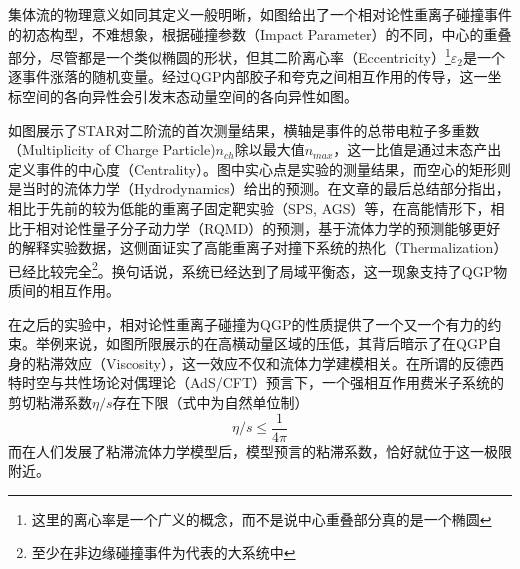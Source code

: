 \documentclass[%
 reprint,
 amsmath,amssymb,
 aps,
]{revtex4-1}
\begin{document}
集体流的物理意义如同其定义一般明晰，如图给出了一个相对论性重离子碰撞事件的初态构型，不难想象，根据碰撞参数（Impact Parameter）的不同，中心的重叠部分，尽管都是一个类似椭圆的形状，但其二阶离心率（Eccentricity）\footnote{这里的离心率是一个广义的概念，而不是说中心重叠部分真的是一个椭圆}$\varepsilon_2$是一个逐事件涨落的随机变量。经过QGP内部胶子和夸克之间相互作用的传导，这一坐标空间的各向异性会引发末态动量空间的各向异性如图。

如图展示了STAR对二阶流的首次测量结果，横轴是事件的总带电粒子多重数（Multiplicity of Charge Particle)$n_{ch}$除以最大值$n_{max}$，这一比值是通过末态产出定义事件的中心度（Centrality）。图中实心点是实验的测量结果，而空心的矩形则是当时的流体力学（Hydrodynamics）给出的预测。在文章的最后总结部分指出，相比于先前的较为低能的重离子固定靶实验（SPS, AGS）等，在高能情形下，相比于相对论性量子分子动力学（RQMD）的预测，基于流体力学的预测能够更好的解释实验数据，这侧面证实了高能重离子对撞下系统的热化（Thermalization）已经比较完全\footnote{至少在非边缘碰撞事件为代表的大系统中}。换句话说，系统已经达到了局域平衡态，这一现象支持了QGP物质间的相互作用。

在之后的实验中，相对论性重离子碰撞为QGP的性质提供了一个又一个有力的约束。举例来说，如图所限展示的在高横动量区域的压低，其背后暗示了在QGP自身的粘滞效应（Viscosity），这一效应不仅和流体力学建模相关。在所谓的反德西特时空与共性场论对偶理论（AdS/CFT）预言下，一个强相互作用费米子系统的剪切粘滞系数$\eta/s$存在下限（式中为自然单位制）
\begin{equation}
    \eta/s \leq \frac{1}{4\pi}
\end{equation}
而在人们发展了粘滞流体力学模型后，模型预言的粘滞系数，恰好就位于这一极限附近。
\end{document}
